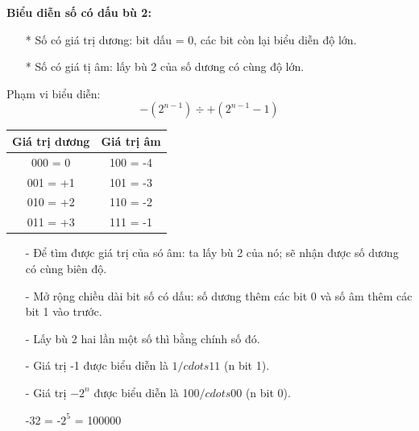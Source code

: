\textbf{Biểu diễn số có dấu bù 2:}
\begin{itemize}
    \item[*] Số có giá trị dương: bit dấu = 0, các bit còn lại biểu diễn độ lớn.
    \item[*] Số có giá tị âm: lấy bù 2 của số dương có cùng độ lớn.
\end{itemize}
Phạm vi biểu diễn:
    \[
        -(2^{n-1}) \div  +(2^{n-1} - 1)
    \]
\begin{table}[h!]
    \centering
    \begin{tabular}{|c|c|}
        \hline
        \textbf{Giá trị dương} & \textbf{Giá trị âm} \\ \hline
        000 = 0                & 100 = -4            \\ 
        001 = +1               & 101 = -3            \\ 
        010 = +2               & 110 = -2            \\ 
        011 = +3               & 111 = -1            \\ \hline
    \end{tabular}
\end{table}
\begin{itemize}
    \item[-] Để tìm được giá trị của só âm: ta lấy bù 2 của nó; sẽ nhận được số dương có cùng biên độ.
    \item[-] Mở rộng chiều dài bit số có dấu: số dương thêm các bit 0 và số âm thêm các bit 1 vào trước.
    \item[-] Lấy bù 2 hai lần một số thì bằng chính số đó.
    \item[-] Giá trị -1 được biểu diễn là $1/cdots11$ (n bit 1).
    \item[-] Giá trị $-2^n$ được biểu diễn là 100$/cdots$00 (n bit 0).
    \begin{center}
        -32 = -$2^5$ = 100000
    \end{center}
\end{itemize}
